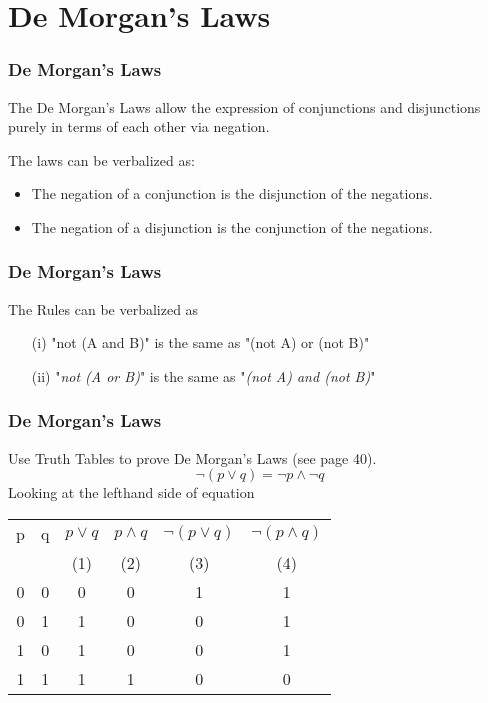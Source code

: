 \documentclass{beamer}
\begin{document}
\section{De Morgan's Laws}

\begin{frame}
	\frametitle{De Morgan's Laws}
\Large
The De Morgan's Laws allow the expression of conjunctions and disjunctions purely in terms of each other via negation.


The laws can be verbalized as:
\begin{itemize}
\item The negation of a conjunction is the disjunction of the negations.
\item The negation of a disjunction is the conjunction of the negations.
\end{itemize}
\end{frame}
\begin{frame}
	\frametitle{De Morgan's Laws}
\Large
The Rules can be verbalized as 

\begin{itemize}
\item[(i)]"not (A and B)" is the same as "(not A) or (not B)"

\item[(ii)] "\textit{not (A or B)}" is the same as "\textit{(not A) and (not B)}"
\end{itemize}
\end{frame}
\begin{frame}
	\frametitle{De Morgan's Laws}
\Large
Use Truth Tables to prove De Morgan's Laws (see page 40).
\[  \neg (p \vee q) = \neg p \wedge \neg q\]
Looking at the lefthand side of equation
\begin{center}
\begin{tabular}{|c|c||c|c|c|c|}
  \hline
p	&	q	&	$ p \vee q$	&	$ p \wedge q$&	$\neg (p \vee q)$	&	$\neg (p \wedge q)$\\
	&		&	(1)	&	(2)	&	(3)	&	(4)	\\ \hline
0	&	0	&	0	&	0	&	1	&	1 \\
0	&	1	&	1	&	0	&	0	&	1\\
1	&	0	&	1	&	0	&	0	&	1\\
1	&	1	&	1	&	1	&	0	&	0\\
  \hline
\end{tabular}
\end{center}
\end{frame}
\end{document}
